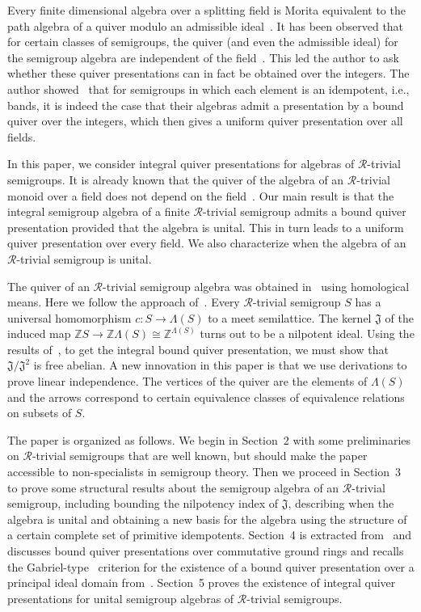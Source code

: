 \documentclass[reqno,11pt]{amsart}
\newcommand{\R}{\mathrel{\mathscr R}} %
\numberwithin{equation}{section}
\begin{document}
Every finite dimensional algebra over a splitting field is Morita equivalent to the path algebra of a quiver modulo an admissible ideal~\cite{assem,benson}.   It has been observed that for certain classes of semigroups, the quiver (and even the admissible ideal) for the semigroup algebra are independent of the field~\cite{DO,ourmemoirs,Saliola,catalan}.  This led the author to ask whether these quiver presentations can in fact be obtained over the integers.   The author showed~\cite{bandquiver} that for semigroups in which each element is an idempotent, i.e., bands, it is indeed the case that their algebras admit a presentation by a bound quiver over the integers, which then gives a uniform quiver presentation over all fields.   

In this paper, we consider integral quiver presentations for algebras of $\mathscr R$-trivial semigroups.  It is already known that the quiver of the algebra of an $\mathscr R$-trivial monoid over a field does not depend on the field~\cite{DO}.  Our main result is that the integral semigroup algebra of a finite $\R$-trivial semigroup admits a bound quiver presentation provided that the algebra is unital.  This in turn leads to a uniform quiver presentation  over every field.  We also characterize when the algebra of an $\R$-trivial semigroup is unital.  

The quiver of an $\R$-trivial semigroup algebra was obtained in~\cite{DO} using homological means. Here we follow the approach of~\cite{bandquiver}.  Every $\R$-trivial semigroup $S$ has a universal homomorphism $c\colon S\to \Lambda(S)$ to a meet semilattice.   The kernel $\mathfrak J$ of the induced map $\mathbb ZS\to \mathbb Z\Lambda(S)\cong \mathbb Z^{\Lambda(S)}$ turns out to be a nilpotent ideal.
Using the results of~\cite{bandquiver}, to get the integral bound quiver presentation, we must show that $\mathfrak J/\mathfrak J^2$ is free abelian.  A new innovation in this paper is that we use derivations to prove linear independence.   The vertices of the quiver are the elements of $\Lambda(S)$ and the arrows correspond to certain equivalence classes of equivalence relations on subsets of $S$.


The paper is organized as follows.  We begin in Section~2 with some preliminaries on $\R$-trivial semigroups that are well known, but should make the paper accessible to non-specialists in semigroup theory.   Then we proceed in Section~3 to prove some structural results about the semigroup algebra of an $\R$-trivial semigroup, including bounding the nilpotency index of $\mathfrak J$, describing when the algebra is unital and obtaining a new basis for the algebra using the structure of a certain complete set of primitive idempotents.   Section~4 is extracted from~\cite{bandquiver} and discusses bound quiver presentations over commutative ground rings and recalls the Gabriel-type~\cite{assem,benson}
 criterion for the existence of a bound quiver presentation over a principal ideal domain from~\cite{bandquiver}.  Section~5 proves the existence of integral quiver presentations for unital semigroup algebras of $\R$-trivial semigroups. 
\end{document}
